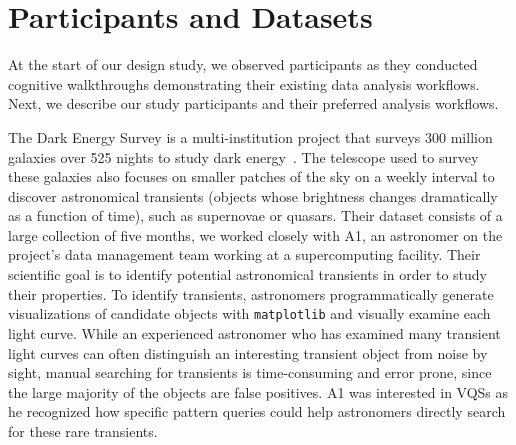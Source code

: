 \section{Participants and Datasets\label{sec:participantdatasets}}
At the start of our design study, we observed participants as they conducted cognitive walkthroughs demonstrating their existing data analysis workflows. Next, we describe our study participants and their preferred analysis workflows.%
\par\noindent{} The Dark Energy Survey is a multi-institution project that surveys 300 million galaxies over 525 nights to study dark energy~\cite{Drlica-Wagner2017}. The telescope used to survey these galaxies also focuses on smaller patches of the sky on a weekly interval to discover astronomical transients (objects whose brightness changes dramatically as a function of time), such as supernovae or quasars. Their dataset consists of a large collection of  five months, we worked closely with A1, an astronomer on the project's data management team working at a supercomputing facility. Their scientific goal is to identify potential astronomical transients in order to study their properties. 
\npar To identify transients, astronomers programmatically generate visualizations of candidate objects with \texttt{matplotlib} and visually examine each light curve. While an experienced astronomer who has examined many transient light curves can often distinguish an interesting transient object from noise by sight, manual searching for transients is time-consuming and error prone, since the large majority of the objects are false positives. A1 was interested in VQSs as he recognized how specific pattern queries could help astronomers directly search for these rare transients.
